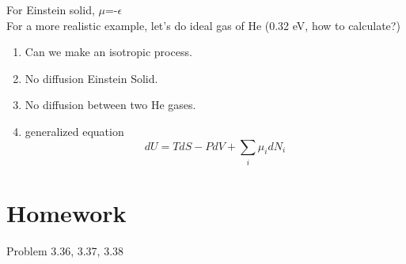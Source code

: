 \documentclass[twoside]{article}
\begin{document}
For Einstein solid, $\mu$=-$\epsilon$\\
For a more realistic example, let's do ideal gas of He (0.32 eV, how to calculate?)
\begin{enumerate}
\item Can we make an isotropic process.
\item No diffusion Einstein Solid.
\item No diffusion between two He gases.
\item generalized equation
\begin{equation} dU = TdS - PdV  + \sum_{\substack{i}} \mu_i dN_i\end{equation}
\end{enumerate}


\section{Homework}
Problem 3.36, 3.37, 3.38
\end{document}
